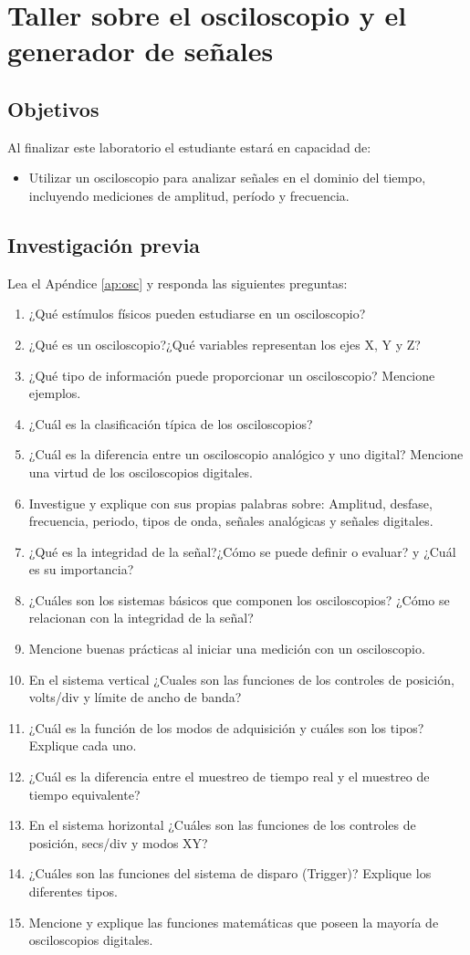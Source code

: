 \documentclass[12pt,letterpaper]{report}
\newcommand{\obj}{Objetivos}
\newcommand{\inv}{Investigación previa}
\newcommand{\capacidad}{Al finalizar este laboratorio el estudiante estará en capacidad de:}
\begin{document}
\chapter{Taller sobre el osciloscopio y el generador de señales}

\section{\obj}
\capacidad
\begin{itemize}
\item Utilizar un osciloscopio para analizar señales en el dominio del tiempo, incluyendo mediciones de amplitud, período y frecuencia.
\end{itemize}

\section{\inv}
Lea el Apéndice \ref{ap:osc} y responda las siguientes preguntas:
\begin{enumerate}
\item ¿Qué estímulos físicos pueden estudiarse en un osciloscopio?
\item ¿Qué es un osciloscopio?¿Qué variables representan los ejes X, Y y Z?
\item ¿Qué tipo de información puede proporcionar un osciloscopio? Mencione ejemplos.
\item ¿Cuál es la clasificación típica de los osciloscopios?
\item ¿Cuál es la diferencia entre un osciloscopio analógico y uno digital? Mencione una virtud de los osciloscopios digitales.
\item Investigue y explique con sus propias palabras sobre: Amplitud, desfase, frecuencia, periodo, tipos de onda, señales analógicas y señales digitales.
\item ¿Qué es la integridad de la señal?¿Cómo se puede definir o evaluar? y ¿Cuál es su importancia?
\item ¿Cuáles son los sistemas básicos que componen los osciloscopios? ¿Cómo se relacionan con la integridad de la señal?
\item Mencione buenas prácticas al iniciar una medición con un osciloscopio.
\item En el sistema vertical ¿Cuales son las funciones de los controles de posición, volts/div y límite de ancho de banda?
\item ¿Cuál es la función de los modos de adquisición y cuáles son los tipos? Explique cada uno.
\item ¿Cuál es la diferencia entre el muestreo de tiempo real y el muestreo de tiempo equivalente?
\item En el sistema horizontal ¿Cuáles son las funciones de los controles de posición, secs/div y modos XY?
\item ¿Cuáles son las funciones del sistema de disparo (Trigger)? Explique los diferentes tipos.
\item Mencione y explique las funciones matemáticas que poseen la mayoría de osciloscopios digitales.
\end{enumerate}
\end{document}
